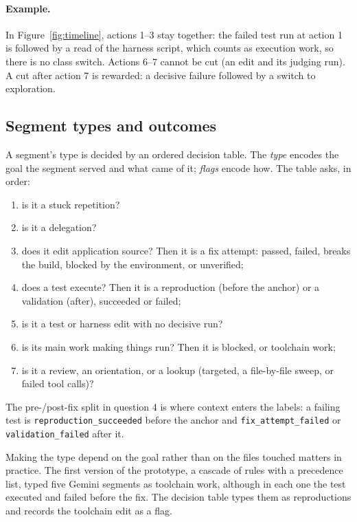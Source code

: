 \documentclass[sigconf,nonacm,10pt]{acmart}
\newcommand{\code}[1]{\texttt{#1}}
\begin{document}
\paragraph{Example.} In Figure~\ref{fig:timeline}, actions 1--3 stay together: the
failed test run at action 1 is followed by a read of the harness script, which counts
as execution work, so there is no class switch. Actions 6--7 cannot be cut (an edit and
its judging run). A cut after action 7 is rewarded: a decisive failure followed by a
switch to exploration.

\subsection{Segment types and outcomes}
\label{sec:types}
A segment's type is decided by an ordered decision table. The \emph{type} encodes the
goal the segment served and what came of it; \emph{flags} encode how. The table asks,
in order:
\begin{enumerate}
  \item is it a stuck repetition?
  \item is it a delegation?
  \item does it edit application source? Then it is a fix attempt: passed, failed,
        breaks the build, blocked by the environment, or unverified;
  \item does a test execute? Then it is a reproduction (before the anchor) or a
        validation (after), succeeded or failed;
  \item is it a test or harness edit with no decisive run?
  \item is its main work making things run? Then it is blocked, or toolchain work;
  \item is it a review, an orientation, or a lookup (targeted, a file-by-file sweep,
        or failed tool calls)?
\end{enumerate}
The pre-/post-fix split in question 4 is where context enters the labels: a failing
test is \code{reproduction\_succeeded} before the anchor and \code{fix\_attempt\_failed}
or \code{validation\_failed} after it.

Making the type depend on the goal rather than on the files touched matters in
practice. The first version of the prototype, a cascade of rules with a precedence
list, typed five Gemini segments as toolchain work, although in each one the test
executed and failed before the fix. The decision table types them as reproductions
and records the toolchain edit as a flag.
\end{document}
